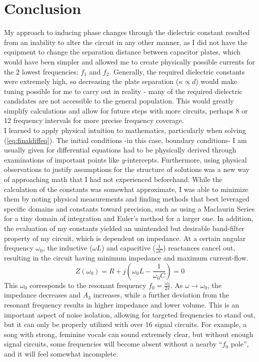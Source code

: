 \documentclass[12pt]{article}
\numberwithin{equation}{section}
\begin{document}
\section{Conclusion}
\noindent My approach to inducing phase changes through the dielectric constant resulted from an inability to alter the circuit in any other manner, as I did not have the equipment to change the separation distance between capacitor plates, which would have been simpler and allowed me to create physically possible currents for the 2 lowest frequencies: $f_1$ and $f_2$. Generally, the required dielectric constants were extremely high, so decreasing the plate separation ($\kappa \propto
d$) would make tuning possible for me to carry out in reality - many of the required dielectric candidates are not accessible to the general population. This would greatly simplify calculations and allow for future steps with more circuits, perhaps 8 or 12 frequency intervals for more precise frequency coverage.\\
\noindent I learned to apply physical intuition to mathematics, particularly when solving (\ref{eq:finaldiffeq}). The initial conditions -in this case, boundary conditions- I am usually given for differential equations had to be physically derived through examinations of important points like \textit{y}-intercepts. Furthermore, using physical observations to justify assumptions for the structure of solutions was a new way of approaching math that I had not experienced beforehand. While the calculation of the constants was somewhat approximate, I was able to minimize them by noting physical measurements and finding methods that best leveraged specific domains and constants toward precision, such as using a Maclaurin Series for a tiny domain of integration and Euler's method for a larger one.
\noindent In addition, the evaluation of my constants yielded an unintended but desirable band-filter property of my circuit, which is dependent on impedance. At a certain angular frequency $\omega_0$, the inductive ($\omega L$) and capacitive ($\frac{1}{\omega C}$) reactances cancel out, resulting in the circuit having minimum impedance and maximum current-flow.
\begin{equation}
    Z(\omega_0) = R + j\left(\omega_0 L -\frac{1}{\omega_0 C} \right) = 0
\end{equation}
This $\omega_0$ corresponds to the resonant frequency $f_0 = \frac{\omega_0}{2\pi}$. As $\omega \rightarrow \omega_0$, the impedance decreases and $A_3$ increases, while a further deviation from the resonant frequency results in higher impedance and lower volume. This is an important aspect of noise isolation, allowing for targeted frequencies to stand out, but it can only be properly utilized with over 16 signal circuits. For example, a song with strong, feminine vocals can sound extremely clear, but without enough signal circuits, some frequencies will become absent without a nearby ``$f_0$ pole'', and it will feel somewhat incomplete.
\newpage
\end{document}
